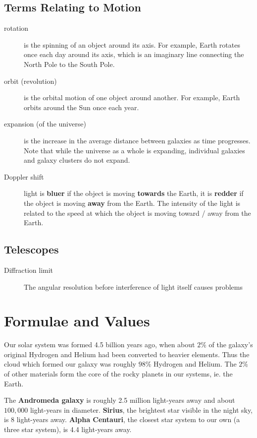 \documentclass[12pt]{article}
\begin{document}
\subsection{Terms Relating to Motion}
\begin{description}
\item[rotation] is the spinning of an object around its axis. For example, Earth rotates once each day around its axis, which is an imaginary
line connecting the North Pole to the South Pole.
\item[orbit (revolution)] is the orbital motion of one object around another. For example, Earth orbits around the Sun once each year.
\item[expansion (of the universe)] is the increase in the average distance between galaxies as time progresses. Note that while the universe as a whole is expanding, individual galaxies and galaxy clusters do not expand.
\item[Doppler shift] light is \textbf{bluer} if the object is moving \textbf{towards} the Earth, it is \textbf{redder} if the object is moving \textbf{away} from the Earth. The intensity of the light is related to the speed at which the object is moving toward / away from the Earth.
\end{description}

\subsection{Telescopes}
\begin{description}
\item[Diffraction limit] The angular resolution before interference of light itself causes problems
\end{description}


\section{Formulae and Values}
Our solar system was formed 4.5 billion years ago, when about $2\%$ of the galaxy's original Hydrogen and Helium had been converted to heavier elements. Thus the cloud which formed our galaxy was roughly $98\%$ Hydrogen and Helium. The $2\%$ of other materials form the core of the rocky planets in our systems, ie. the Earth.

The {\bf Andromeda galaxy} is roughly 2.5 million light-years away and about $100,000$ light-years in diameter. {\bf Sirius}, the brightest star visible in the night sky, is 8 light-years away. {\bf Alpha Centauri}, the closest star system to our own (a three star system), is 4.4 light-years away.
\end{document}
